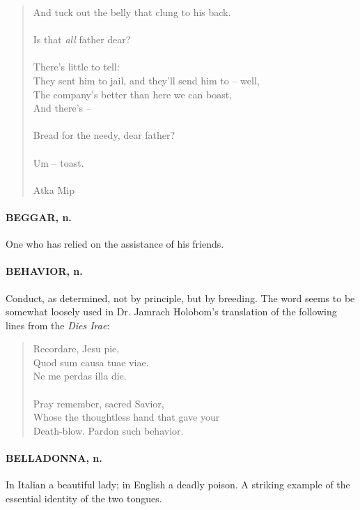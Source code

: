 \documentclass[11pt]{article}
\begin{document}
\begin{quote}
  And tuck out the belly that clung to his back. \\
 \\
  Is that {\em all} father dear? \\
 \\
                              There's little to tell: \\
  They sent him to jail, and they'll send him to -- well, \\
  The company's better than here we can boast, \\
  And there's -- \\
 \\
                  Bread for the needy, dear father? \\
 \\
                                                     Um -- toast. \\
 \\
Atka Mip \end{quote}


\paragraph{BEGGAR, n.}  One who has relied on the assistance of his friends.

\paragraph{BEHAVIOR, n.}  Conduct, as determined, not by principle, but by
breeding.  The word seems to be somewhat loosely used in Dr. Jamrach
Holobom's translation of the following lines from the {\em Dies Irae}:

\begin{quote}       Recordare, Jesu pie, \\
      Quod sum causa tuae viae. \\
      Ne me perdas illa die. \\
 \\
  Pray remember, sacred Savior, \\
  Whose the thoughtless hand that gave your \\
  Death-blow.  Pardon such behavior.  \end{quote}

\paragraph{BELLADONNA, n.}  In Italian a beautiful lady; in English a deadly
poison.  A striking example of the essential identity of the two
tongues.
\end{document}
